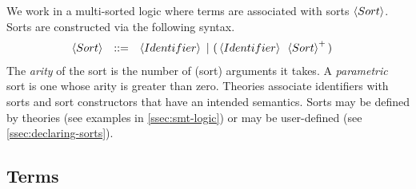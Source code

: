 \documentclass[english,a4paper,10pt]{article}
\begin{document}
We work in a multi-sorted logic where terms 
are associated with sorts $\left\langle Sort\right\rangle$.
Sorts are constructed via the following syntax.
\begin{alignat*}{1}
 & \begin{array}{rcl}
\left\langle Sort\right\rangle & ::= & \left\langle Identifier\right\rangle\mbox{ }|\mbox{ }{\tt (}\left\langle Identifier\right\rangle\mbox{ }\left\langle Sort\right\rangle^{+}{\tt )}\\
\end{array}
\end{alignat*}
The \emph{arity} of the sort is the number of (sort) arguments it takes.
A \emph{parametric} sort is one whose arity is greater than zero.
Theories associate identifiers with sorts and sort constructors
that have an intended semantics.
Sorts may be defined by theories (see examples in \cref{ssec:smt-logic})
or may be user-defined
(see \cref{ssec:declaring-sorts}).

\subsection{Terms}
\end{document}

